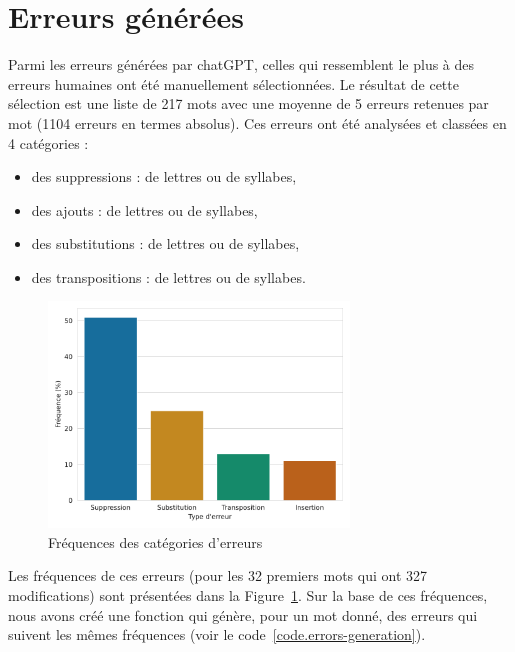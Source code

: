 \section{Erreurs générées}%
\label{sec.results.errors}

Parmi les erreurs générées par chatGPT, 
celles qui ressemblent le plus à des erreurs humaines ont été manuellement sélectionnées.
Le résultat de cette sélection est une liste de 217 mots 
avec une moyenne de 5 erreurs retenues par mot (1104 erreurs en termes absolus).
Ces erreurs ont été analysées et classées en 4 catégories :
\begin{itemize}
    \item des suppressions : de lettres ou de syllabes,
    \item des ajouts : de lettres ou de syllabes,
    \item des substitutions : de lettres ou de syllabes,
    \item des transpositions : de lettres ou de syllabes.
\end{itemize}

\begin{figure}[hbt]
    \centering
    \includegraphics[width=8cm]{assets/python/rules-stats.pdf}
    \caption{Fréquences des catégories d'erreurs}
    \label{fig.errors-freq}
\end{figure}

Les fréquences de ces erreurs (pour les 32 premiers mots qui ont 327 modifications) 
sont présentées dans la Figure~\ref{fig.errors-freq}.
Sur la base de ces fréquences, nous avons créé une fonction qui génère, pour un mot donné,
des erreurs qui suivent les mêmes fréquences (voir le code~\ref{code.errors-generation}).

